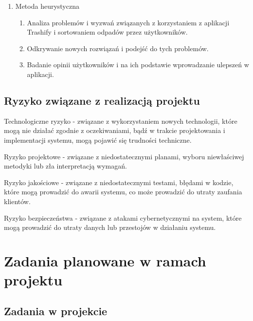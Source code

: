 \documentclass[12pt,oneside]{book}
\begin{document}
\begin{enumerate}
    \item Metoda heurystyczna
    
       
    \begin{enumerate}[label=--]
        \item Analiza problemów i wyzwań związanych z korzystaniem z aplikacji Trashify i sortowaniem odpadów przez użytkowników.
        \item Odkrywanie nowych rozwiązań i podejść do tych problemów.
        \item Badanie opinii użytkowników i na ich podstawie wprowadzanie ulepszeń w aplikacji.
    \end{enumerate}

\end{enumerate}

\section{Ryzyko związane z realizacją projektu}


Technologiczne ryzyko - związane z wykorzystaniem nowych technologii, które mogą nie działać zgodnie z oczekiwaniami, bądź w trakcie projektowania i implementacji systemu, mogą pojawić się trudności techniczne.

Ryzyko projektowe - związane z niedostatecznymi planami, wyboru niewłaściwej metodyki lub zła interpretacją wymagań.

Ryzyko jakościowe - związane z niedostatecznymi testami, błędami w kodzie, które mogą prowadzić do awarii systemu, co może prowadzić do utraty zaufania klientów.

Ryzyko bezpieczeństwa - związane z atakami cybernetycznymi na system, które mogą prowadzić do utraty danych lub przestojów w działaniu systemu.

\newpage

{\let\clearpage\relax\chapter{Zadania planowane w ramach projektu}}

\section{Zadania w projekcie}
\end{document}
